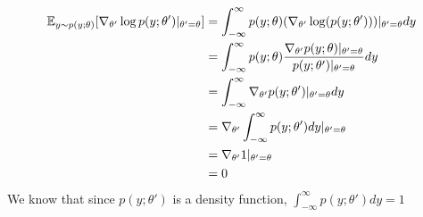 \begin{answer}
\begin{align*}
    \mathbb{E}_{y\sim p(y;\theta)}[\nabla_{\theta'} \log p(y;\theta')|_{\theta'=\theta}]&=\int_{-\infty}^{\infty}p(y;\theta)(\nabla_{\theta'} \log(p(y;\theta')))|_{\theta'=\theta}dy\\
    &=\int_{-\infty}^{\infty}p(y;\theta)\dfrac{\nabla_{\theta'} p(y;\theta)|_{\theta'=\theta}}{p(y;\theta')|_{\theta'=\theta}}dy\\
    &=\int_{-\infty}^{\infty}\nabla_{\theta'} p(y;\theta')|_{\theta'=\theta}dy\\
    &=\nabla_{\theta'} \int_{-\infty}^{\infty} p(y;\theta')dy|_{\theta'=\theta}\\
    &=\nabla_{\theta'} 1|_{\theta'=\theta}\\
    &=0
\end{align*}
We know that since $p(y;\theta')$ is a density function, $\int_{-\infty}^{\infty} p(y;\theta')dy=1$\\
\end{answer}
